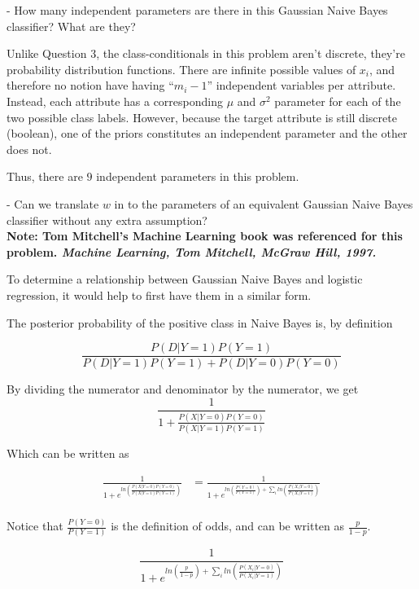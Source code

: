 \documentclass[11pt,largemargins]{homework}
\begin{document}
\begin{alphaparts}
	\questionpart
	- How many independent parameters are there in this Gaussian Naive Bayes classifier? What are they?

	Unlike Question 3, the class-conditionals in this problem aren't discrete, they're probability distribution functions. There are infinite possible values of $x_i$, and therefore no notion have having ``$m_i-1$'' independent variables per attribute. Instead, each attribute has a corresponding $\mu$ and $\sigma^2$ parameter for each of the two possible class labels. However, because the target attribute is still discrete (boolean), one of the priors constitutes an independent parameter and the other does not.

	Thus, there are $9$ independent parameters in this problem.

	- Can we translate $w$ in to the parameters of an equivalent Gaussian Naive Bayes classifier without any extra assumption?\\
	{\footnotesize\bf
		Note:  Tom Mitchell's Machine Learning book was referenced for this problem.
		{\itshape 
			Machine Learning, Tom Mitchell, McGraw Hill, 1997.
		}
	}


	To determine a relationship between Gaussian Naive Bayes and logistic regression, it would help to first have them in a similar form. 
	
	The posterior probability of the positive class in Naive Bayes is, by definition

	$$\frac{P(D|Y=1)P(Y=1)}{P(D|Y=1)P(Y=1)+P(D|Y=0)P(Y=0)}$$

	By dividing the numerator and denominator by the numerator, we get
	$$\frac{1}{1+\frac{P(X|Y=0)P(Y=0)}{P(X|Y=1)P(Y=1)}}$$

	Which can be written as
	
	\begin{align*}
		\frac{1}{1+e^{ln\left(\frac{P(X|Y=0)P(Y=0)}{P(X|Y=1)P(Y=1)}\right)}} &= \frac{1}{1+e^{ln\left( \frac{P(Y=0)}{P(Y=1)} \right) + \sum_i ln\left( \frac{P(X_i|Y=0)}{P(X_i|Y=1)} \right)}} \\
	\end{align*}
	
	Notice that $\frac{P(Y=0)}{P(Y=1)}$ is the definition of odds, and can be written as $\frac{p}{1-p}$.

	$$\frac{1}{1+e^{ln\left( \frac{p}{1-p} \right) + \sum_i ln\left( \frac{P(X_i|Y=0)}{P(X_i|Y=1)} \right)}}$$


\end{alphaparts}
\end{document}
